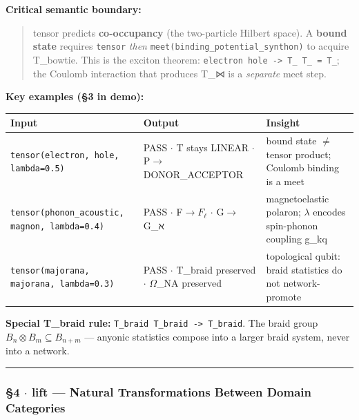 \documentclass[12pt,a4paper]{article}
\begin{document}
\textbf{Critical semantic boundary:}

\begin{quote}
tensor predicts \textbf{co-occupancy} (the two-particle Hilbert space). A \textbf{bound state} requires \texttt{tensor} \emph{then} \texttt{meet(binding\_potential\_synthon)} to acquire T\_bowtie. This is the exciton theorem: \texttt{electron \otimes hole -\textgreater{} T\_\textbar{} \otimes T\_\textbar{} = T\_\textbar{}}; the Coulomb interaction that produces T\_⋈ is a \emph{separate} meet step.

\end{quote}

\textbf{Key examples (§3 in demo):}

\begin{table}[htbp]
\centering
\small
{}
\begin{tabularx}{\textwidth}{>{\centering\arraybackslash}X >{\centering\arraybackslash}X >{\centering\arraybackslash}X}
\toprule
\rowcolor{gray!25}\textbf{Input} & \textbf{Output} & \textbf{Insight} \\
\midrule
\rowcolors{1}{white}{gray!10}
\texttt{tensor(electron, hole, lambda=0.5)} & PASS $\cdot$ T stays LINEAR $\cdot$ P$\rightarrow$DONOR\_ACCEPTOR & bound state $\neq$ tensor product; Coulomb binding is a meet \\
\texttt{tensor(phonon\_acoustic, magnon, lambda=0.4)} & PASS $\cdot$ F$\rightarrow$$F_{\ell}$ $\cdot$ G$\rightarrow$G\_ℵ & magnetoelastic polaron; $\lambda$ encodes spin-phonon coupling g\_kq \\
\texttt{tensor(majorana, majorana, lambda=0.3)} & PASS $\cdot$ T\_braid preserved $\cdot$ $\Omega$\_NA preserved & topological qubit: braid statistics do not network-promote \\
\bottomrule
\end{tabularx}
\end{table}

\textbf{Special T\_braid rule:} \texttt{T\_braid \otimes T\_braid -\textgreater{} T\_braid}. The braid group $B_n \otimes B_m \subseteq B_{n+m}$ --- anyonic statistics compose into a larger braid system, never into a network.

\begin{center}
\rule{0.5\textwidth}{0.4pt}
\end{center}

\subsubsection{§4 $\cdot$ lift --- Natural Transformations Between Domain Categories}
\end{document}
